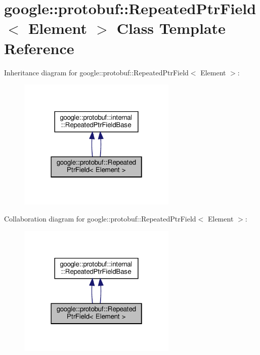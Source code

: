 \hypertarget{classgoogle_1_1protobuf_1_1RepeatedPtrField}{}\section{google\+:\+:protobuf\+:\+:Repeated\+Ptr\+Field$<$ Element $>$ Class Template Reference}
\label{classgoogle_1_1protobuf_1_1RepeatedPtrField}


Inheritance diagram for google\+:\+:protobuf\+:\+:Repeated\+Ptr\+Field$<$ Element $>$\+:
\nopagebreak
\begin{figure}[H]
\begin{center}
\leavevmode
\includegraphics[width=214pt]{classgoogle_1_1protobuf_1_1RepeatedPtrField__inherit__graph}
\end{center}
\end{figure}


Collaboration diagram for google\+:\+:protobuf\+:\+:Repeated\+Ptr\+Field$<$ Element $>$\+:
\nopagebreak
\begin{figure}[H]
\begin{center}
\leavevmode
\includegraphics[width=214pt]{classgoogle_1_1protobuf_1_1RepeatedPtrField__coll__graph}
\end{center}
\end{figure}
